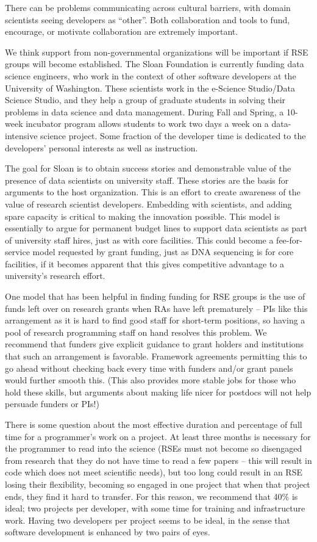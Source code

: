 There can be problems communicating across cultural barriers, with domain
scientists seeing developers as ``other''. Both collaboration and tools to fund,
encourage, or motivate collaboration are extremely important. 

We think support from non-governmental organizations will be important if RSE
groups will become established. The Sloan Foundation is currently funding data
science engineers, who work in the context of other software developers at the
University of Washington. These scientists work in the e-Science Studio/Data
Science Studio, and they help a group of graduate students in solving their
problems in data science and data management. During Fall and Spring, a 10-week
incubator program allows students to work two days a week on a data-intensive
science project. Some fraction of the developer time is dedicated to the
developers' personal interests as well as instruction.

The goal for Sloan is to obtain success stories and demonstrable value
of the presence of data scientists on university staff. These stories are the
basis for arguments to the host organization. This is an effort to create
awareness of the value of research scientist developers. Embedding with
scientists, and adding spare capacity is critical to making the innovation
possible. This model is essentially to argue for permanent budget lines to
support data scientists as part of university staff hires, just as with core
facilities. This could become a fee-for-service model requested by grant
funding, just as DNA sequencing is for core facilities, if it becomes apparent
that this gives competitive advantage to a university's research effort.

One model that has been helpful in finding funding for RSE groups is the use of
funds left over on research grants when RAs have left prematurely -- PIs like
this arrangement as it is hard to find good staff for short-term positions, so
having a pool of research programming staff on hand resolves this problem. We
recommend that funders give explicit guidance to grant holders and institutions
that such an arrangement is favorable. Framework agreements permitting this to go
ahead without checking back every time with funders and/or grant panels would
further smooth this. (This also provides more stable jobs for those who hold
these skills, but arguments about making life nicer for postdocs will not help
persuade funders or PIs!)

There is some question about the most effective duration and percentage of full
time for a programmer's work on a project. At least three months is necessary
for the programmer to read into the science (RSEs must not become so disengaged
from research that they do not have time to read a few papers -- this will result
in code which does not meet scientific needs), but too long could result in an
RSE losing their flexibility, becoming so engaged in one project that when that
project ends, they find it hard to transfer. For this reason, we recommend
that 40$\%$ is ideal; two projects per developer, with some time for
training and infrastructure work. Having two developers per project seems to be ideal,
in the sense that software development is enhanced by two pairs of eyes.


